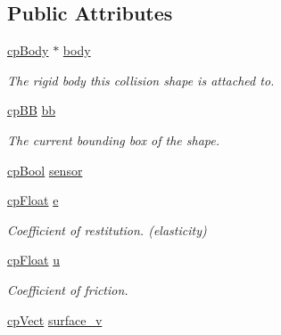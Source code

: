 \subsection*{Public Attributes}
\begin{DoxyCompactItemize}
\item 
\hypertarget{structcp_shape_a78d93185612c5dd17ca98574250c3bbf}{\hyperlink{structcp_body}{cp\-Body} $\ast$ \hyperlink{structcp_shape_a78d93185612c5dd17ca98574250c3bbf}{body}}\label{structcp_shape_a78d93185612c5dd17ca98574250c3bbf}

\begin{DoxyCompactList}\small\item\em The rigid body this collision shape is attached to. \end{DoxyCompactList}\item 
\hypertarget{structcp_shape_a116c20032e88c91b24bc4db58fe03281}{\hyperlink{structcp_b_b}{cp\-B\-B} \hyperlink{structcp_shape_a116c20032e88c91b24bc4db58fe03281}{bb}}\label{structcp_shape_a116c20032e88c91b24bc4db58fe03281}

\begin{DoxyCompactList}\small\item\em The current bounding box of the shape. \end{DoxyCompactList}\item 
\hyperlink{group__basic_types_gab6e5d8afee598a57cd323abae5310244}{cp\-Bool} \hyperlink{structcp_shape_a313e68986b75440efbce418429ad11e3}{sensor}
\item 
\hypertarget{structcp_shape_aa9c5e01e7c76b34e052a33ecb4df4df4}{\hyperlink{group__basic_types_gac1ed65573e035bf892505768c852d8d3}{cp\-Float} \hyperlink{structcp_shape_aa9c5e01e7c76b34e052a33ecb4df4df4}{e}}\label{structcp_shape_aa9c5e01e7c76b34e052a33ecb4df4df4}

\begin{DoxyCompactList}\small\item\em Coefficient of restitution. (elasticity) \end{DoxyCompactList}\item 
\hypertarget{structcp_shape_a9fbe92c5b0971f43fe0519241c6a1b0e}{\hyperlink{group__basic_types_gac1ed65573e035bf892505768c852d8d3}{cp\-Float} \hyperlink{structcp_shape_a9fbe92c5b0971f43fe0519241c6a1b0e}{u}}\label{structcp_shape_a9fbe92c5b0971f43fe0519241c6a1b0e}

\begin{DoxyCompactList}\small\item\em Coefficient of friction. \end{DoxyCompactList}\item 
\hypertarget{structcp_shape_a9c85993daba2b41274c1665b5546f6ab}{\hyperlink{structcp_vect}{cp\-Vect} \hyperlink{structcp_shape_a9c85993daba2b41274c1665b5546f6ab}{surface\-\_\-v}}\label{structcp_shape_a9c85993daba2b41274c1665b5546f6ab}


\end{DoxyCompactItemize}
